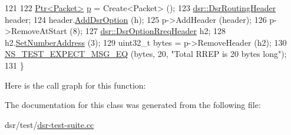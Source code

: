 \begin{DoxyCode}
121 
122   \hyperlink{classns3_1_1Ptr}{Ptr<Packet>} \hyperlink{lte__link__budget_8m_ac9de518908a968428863f829398a4e62}{p} = Create<Packet> ();
123   \hyperlink{classns3_1_1dsr_1_1DsrRoutingHeader}{dsr::DsrRoutingHeader} header;
124   header.\hyperlink{classns3_1_1dsr_1_1DsrOptionField_acd03d07018e22f5e2b23975fae84fb3c}{AddDsrOption} (h);
125   p->AddHeader (header);
126   p->RemoveAtStart (8);
127   \hyperlink{classns3_1_1dsr_1_1DsrOptionRreqHeader}{dsr::DsrOptionRreqHeader} h2;
128   h2.\hyperlink{classns3_1_1dsr_1_1DsrOptionRreqHeader_a1d42a53f53dc4e83173e1ced8b1520c0}{SetNumberAddress} (3);
129   uint32\_t bytes = p->RemoveHeader (h2);
130   \hyperlink{group__testing_ga7304ba46a28d8cf08dfdfd6499cf7068}{NS\_TEST\_EXPECT\_MSG\_EQ} (bytes, 20, \textcolor{stringliteral}{"Total RREP is 20 bytes long"});
131 \}
\end{DoxyCode}


Here is the call graph for this function\+:




The documentation for this class was generated from the following file\+:\begin{DoxyCompactItemize}
\item 
dsr/test/\hyperlink{dsr-test-suite_8cc}{dsr-\/test-\/suite.\+cc}\end{DoxyCompactItemize}
